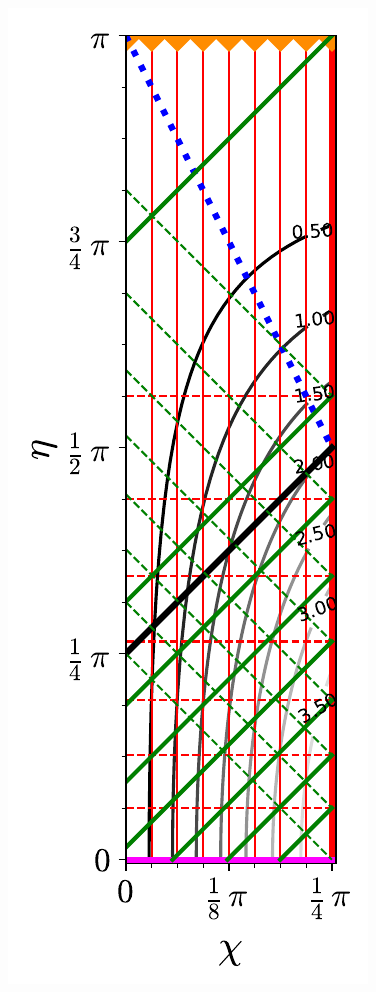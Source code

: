 \begin{figure}
\centerline{
\includegraphics[height=0.55\textheight]{lem_OS_diag_int.pdf}\qquad
}
\end{figure}
